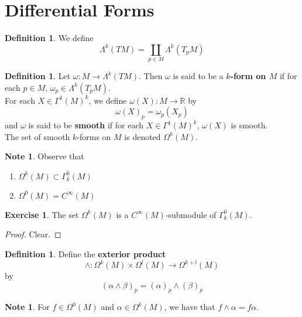 \documentclass{book}
\theoremstyle{definition}
\newtheorem{defn}[definition]{Definition}
\newtheorem{note}[definition]{Note}
\newtheorem{ex}[definition]{Exercise}
\newcommand{\al}{\alpha}
\newcommand{\be}{\beta}
\newcommand{\om}{\omega}
\newcommand{\Gam}{\Gamma}
\newcommand{\Lam}{\Lambda}
\newcommand{\Om}{\Omega}
\newcommand{\R}{\mathbb{R}}
\DeclareMathOperator*{\0}{\mbf{0}}
\DeclareMathOperator*{\1}{\mbf{1}}
\newcommand{\tbf}[1]{\textbf{#1}}
\begin{document}
	
	
	
	
	
	
	
	
	
	
	

	
	\newpage	
	\section{Differential Forms}
	
	\begin{defn}
		We define $$\Lam^k (TM) = \coprod_{p \in M} \Lam^k(T_p M)$$
	\end{defn}
	
	\begin{defn}
		Let $\om: M \rightarrow \Lam^k (TM)$. Then $\om$ is said to be a \tbf{$k$-form on $M$} if for each $p \in M$, $\om_p \in \Lam^k(T_pM)$.\\
		For each $X \in \Gam^1(M)^k$, we define $\om(X) : M \rightarrow \R$ by $$\om(X)_p = \om_p(X_p)$$
		and $\om$ is said to be \tbf{smooth} if for each $X \in \Gam^1(M)^k$, $\om(X)$ is smooth.\\
		The set of smooth $k$-forms on $M$ is denoted $\Om^k(M)$.\\
	\end{defn} 

	\begin{note}
		Observe that 
		\begin{enumerate}
		\item $\Om^k(M) \subset \Gamma^0_k(M)$
		\item $\Om^0(M) = C^{\infty}(M)$
		\end{enumerate}
	\end{note}
	
	\begin{ex}
	The set $\Om^k(M)$ is a $C^{\infty}(M)$-submodule of $\Gam^0_k(M)$.
	\end{ex}
	
	\begin{proof}
	Clear.
	\end{proof}

	

	\begin{defn}
		Define the \tbf{exterior product} $$\wedge: \Om^k(M) \times \Om^l(M) \rightarrow \Om^{k+l}(M) $$ by $$(\al \wedge \be)_p = (\al)_p \wedge (\be)_p$$
	\end{defn}
	
	\begin{note}
		For $f \in \Om^0(M)$ and $\al \in \Om^k(M)$, we have that $f \wedge \al = f \al$.
	\end{note}
	
\end{document}
